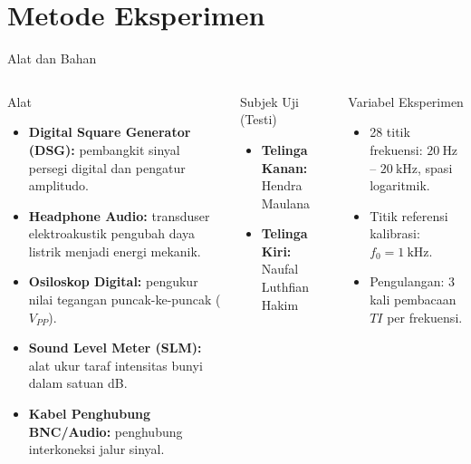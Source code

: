 \documentclass[aspectratio=169, 10pt]{beamer}
\begin{document}
	\section{Metode Eksperimen}

	\begin{frame}{Alat dan Bahan}
		\begin{columns}[T]
			\begin{block}{Alat}
				\footnotesize
				\begin{itemize}
					\item \textbf{Digital Square Generator (DSG):} pembangkit sinyal persegi digital dan pengatur amplitudo.
					\item \textbf{Headphone Audio:} transduser elektroakustik pengubah daya listrik menjadi energi mekanik.
					\item \textbf{Osiloskop Digital:} pengukur nilai tegangan puncak-ke-puncak ($V_{PP}$).
					\item \textbf{Sound Level Meter (SLM):} alat ukur taraf intensitas bunyi dalam satuan dB.
					\item \textbf{Kabel Penghubung BNC/Audio:} penghubung interkoneksi jalur sinyal.
				\end{itemize}
			\end{block}

			\column{0.42\textwidth}
			\begin{block}{Subjek Uji (Testi)}
				\begin{itemize}
					\item \textbf{Telinga Kanan:} Hendra Maulana
					\item \textbf{Telinga Kiri:} Naufal Luthfian Hakim
				\end{itemize}
			\end{block}
			\vspace{0.2cm}
			\begin{exampleblock}{Variabel Eksperimen}
				\footnotesize
				\begin{itemize}
					\item 28 titik frekuensi: $20\ \text{Hz}$ -- $20\ \text{kHz}$, spasi logaritmik.
					\item Titik referensi kalibrasi: $f_0 = 1\ \text{kHz}$.
					\item Pengulangan: 3 kali pembacaan $TI$ per frekuensi.
				\end{itemize}
			\end{exampleblock}
		\end{columns}
	\end{frame}
\end{document}
